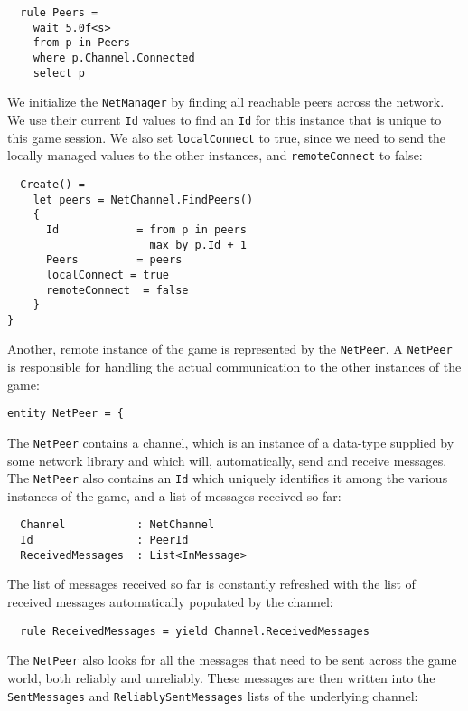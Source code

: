 \begin{lstlisting}
  rule Peers = 
    wait 5.0f<s>
    from p in Peers
    where p.Channel.Connected
    select p
\end{lstlisting}

We initialize the \texttt{NetManager} by finding all reachable peers across the network. We use their current \texttt{Id} values to find an \texttt{Id} for this instance that is unique to this game session. We also set \texttt{localConnect} to true, since we need to send the locally managed values to the other instances, and \texttt{remoteConnect} to false:

\begin{lstlisting}
  Create() =
    let peers = NetChannel.FindPeers()
    {
      Id            = from p in peers
                      max_by p.Id + 1
      Peers         = peers
      localConnect = true
      remoteConnect  = false
    }
}
\end{lstlisting}

Another, remote instance of the game is represented by the \texttt{NetPeer}. A \texttt{NetPeer} is responsible for handling the actual communication to the other instances of the game:

\begin{lstlisting}
entity NetPeer = {
\end{lstlisting}

The \texttt{NetPeer} contains a channel, which is an instance of a data-type supplied by some network library and which will, automatically, send and receive messages. The \texttt{NetPeer} also contains an \texttt{Id} which uniquely identifies it among the various instances of the game, and a list of messages received so far:

\begin{lstlisting}
  Channel           : NetChannel
  Id                : PeerId
  ReceivedMessages  : List<InMessage>
\end{lstlisting}

The list of messages received so far is constantly refreshed with the list of received messages automatically populated by the channel:

\begin{lstlisting}
  rule ReceivedMessages = yield Channel.ReceivedMessages
\end{lstlisting}

The \texttt{NetPeer} also looks for all the messages that need to be sent across the game world, both reliably and unreliably. These messages are then written into the \texttt{SentMessages} and \texttt{ReliablySentMessages} lists of the underlying channel: 

